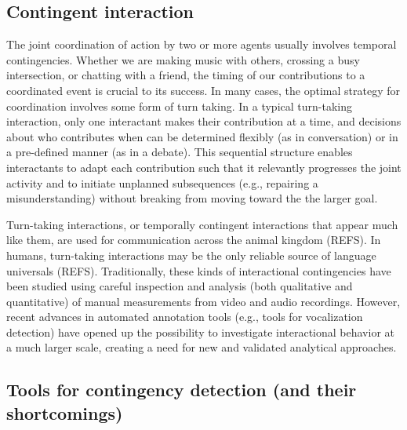\documentclass[10pt, letterpaper]{article}
\begin{document}
\hypertarget{contingent-interaction}{%
\subsection{Contingent interaction}\label{contingent-interaction}}

The joint coordination of action by two or more agents usually involves
temporal contingencies. Whether we are making music with others,
crossing a busy intersection, or chatting with a friend, the timing of
our contributions to a coordinated event is crucial to its success. In
many cases, the optimal strategy for coordination involves some form of
turn taking. In a typical turn-taking interaction, only one interactant
makes their contribution at a time, and decisions about who contributes
when can be determined flexibly (as in conversation) or in a pre-defined
manner (as in a debate). This sequential structure enables interactants
to adapt each contribution such that it relevantly progresses the joint
activity and to initiate unplanned subsequences (e.g., repairing a
misunderstanding) without breaking from moving toward the the larger
goal.

Turn-taking interactions, or temporally contingent interactions that
appear much like them, are used for communication across the animal
kingdom (REFS). In humans, turn-taking interactions may be the only
reliable source of language universals (REFS). Traditionally, these
kinds of interactional contingencies have been studied using careful
inspection and analysis (both qualitative and quantitative) of manual
measurements from video and audio recordings. However, recent advances
in automated annotation tools (e.g., tools for vocalization detection)
have opened up the possibility to investigate interactional behavior at
a much larger scale, creating a need for new and validated analytical
approaches.

\hypertarget{tools-for-contingency-detection-and-their-shortcomings}{%
\subsection{Tools for contingency detection (and their
shortcomings)}\label{tools-for-contingency-detection-and-their-shortcomings}}
\end{document}
